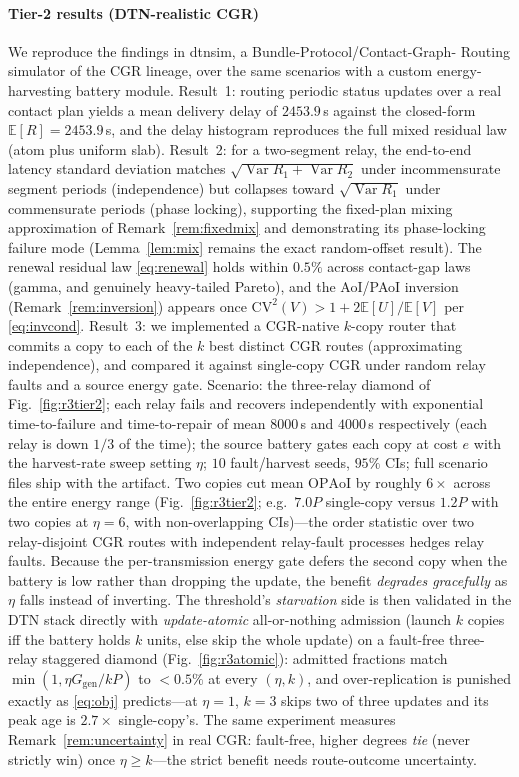 \documentclass[twocolumn,3p,times,procedia]{elsarticle}
\newcommand{\OPAoI}{\mathrm{OPAoI}}
\newcommand{\E}{\mathbb{E}}
\begin{document}
\paragraph*{Tier-2 results (DTN-realistic CGR)}
We reproduce the findings in dtnsim, a Bundle-Protocol/Contact-Graph-
Routing simulator of the CGR lineage, over the same scenarios with a
custom energy-harvesting battery module. Result~1: routing periodic
status updates over a real contact plan yields a mean delivery delay of
$2453.9$\,s against the closed-form $\E[R]{=}2453.9$\,s, and the
delay histogram reproduces the full mixed residual law (atom plus uniform
slab). Result~2: for a two-segment relay, the end-to-end latency standard
deviation matches $\sqrt{\operatorname{Var}R_1+\operatorname{Var}R_2}$
under incommensurate segment periods (independence) but collapses toward
$\sqrt{\operatorname{Var}R_1}$ under commensurate periods (phase locking),
supporting the fixed-plan mixing approximation of
Remark~\ref{rem:fixedmix} and demonstrating its phase-locking failure
mode (Lemma~\ref{lem:mix} remains the exact random-offset
result). The renewal residual
law \eqref{eq:renewal} holds within $0.5\%$ across contact-gap laws
(gamma, and genuinely heavy-tailed Pareto), and the AoI/PAoI inversion
(Remark~\ref{rem:inversion}) appears once
$\mathrm{CV}^2(V)>1+2\E[U]/\E[V]$ per \eqref{eq:invcond}. Result~3: we implemented a CGR-native $k$-copy router that commits a copy
to each of the $k$ best distinct CGR routes (approximating independence), and compared it against
single-copy CGR under random relay faults and a source energy gate.
Scenario: the three-relay diamond of Fig.~\ref{fig:r3tier2}; each relay
fails and recovers independently with exponential time-to-failure and
time-to-repair of mean $8000$\,s and $4000$\,s respectively (each
relay is down $1/3$ of the time); the source battery gates each copy at cost $e$ with the
harvest-rate sweep setting $\eta$; $10$ fault/harvest seeds, $95\%$
CIs; full scenario files ship with the artifact. Two copies cut mean $\OPAoI$ by roughly $6\times$
across the entire energy range (Fig.~\ref{fig:r3tier2}; e.g.\ $7.0P$
single-copy versus $1.2P$ with two copies at $\eta{=}6$, with
non-overlapping CIs)---the order
statistic over two relay-disjoint CGR routes with independent
relay-fault processes hedges relay faults. Because the
per-transmission energy gate defers the second copy when the battery is
low rather than dropping the update, the benefit \emph{degrades
gracefully} as $\eta$ falls instead of inverting. The threshold's
\emph{starvation} side is then validated in the DTN stack directly with
\emph{update-atomic} all-or-nothing admission (launch $k$ copies iff
the battery holds $k$ units, else skip the whole update) on a
fault-free three-relay staggered diamond
(Fig.~\ref{fig:r3atomic}): admitted fractions match
$\min(1,\eta G_{\mathrm{gen}}/kP)$ to $<0.5\%$ at every $(\eta,k)$, and
over-replication is punished exactly as \eqref{eq:obj} predicts---at
$\eta{=}1$, $k{=}3$ skips two of three updates and its peak age is
$2.7\times$ single-copy's. The same experiment measures
Remark~\ref{rem:uncertainty} in real CGR: fault-free, higher degrees
\emph{tie} (never strictly win) once $\eta\ge k$---the strict benefit
needs route-outcome uncertainty.
\end{document}
